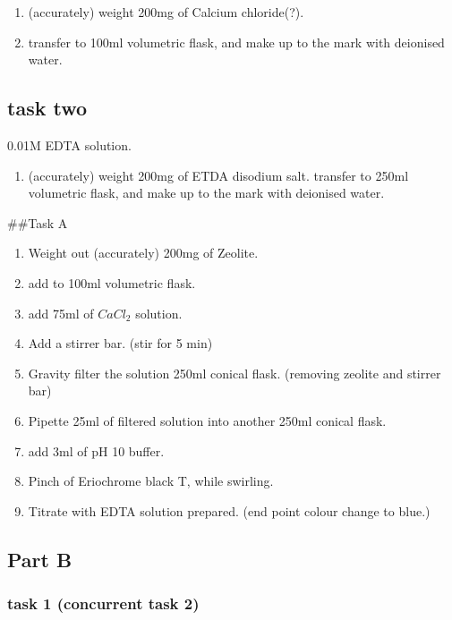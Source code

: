 \documentclass[]{article}
\providecommand{\tightlist}{%
  \setlength{\itemsep}{0pt}\setlength{\parskip}{0pt}}
\begin{document}
\begin{enumerate}
\def\labelenumi{\arabic{enumi}.}
\tightlist
\item
  (accurately) weight 200mg of Calcium chloride(?).
\item
  transfer to 100ml volumetric flask, and make up to the mark with
  deionised water.
\end{enumerate}

\hypertarget{task-two}{%
\subsection{task two}\label{task-two}}

0.01M EDTA solution.

\begin{enumerate}
\def\labelenumi{\arabic{enumi}.}
\tightlist
\item
  (accurately) weight 200mg of ETDA disodium salt. transfer to 250ml
  volumetric flask, and make up to the mark with deionised water.
\end{enumerate}

\#\#Task A

\begin{enumerate}
\def\labelenumi{\arabic{enumi}.}
\tightlist
\item
  Weight out (accurately) 200mg of Zeolite.
\item
  add to 100ml volumetric flask.
\item
  add 75ml of \(CaCl_{2}\) solution.
\item
  Add a stirrer bar. (stir for 5 min)
\item
  Gravity filter the solution 250ml conical flask. (removing zeolite and
  stirrer bar)
\item
  Pipette 25ml of filtered solution into another 250ml conical flask.
\item
  add 3ml of pH 10 buffer.
\item
  Pinch of Eriochrome black T, while swirling.
\item
  Titrate with EDTA solution prepared. (end point colour change to
  blue.)
\end{enumerate}

\hypertarget{part-b}{%
\subsection{Part B}\label{part-b}}

\hypertarget{task-1-concurrent-task-2}{%
\subsubsection{task 1 (concurrent task
2)}\label{task-1-concurrent-task-2}}
\end{document}
